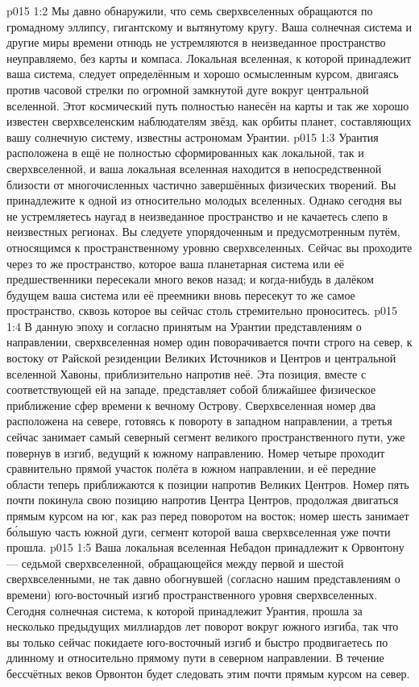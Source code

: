 \vs p015 1:2 Мы давно обнаружили, что семь сверхвселенных обращаются по громадному эллипсу, гигантскому и вытянутому кругу. Ваша солнечная система и другие миры времени отнюдь не устремляются в неизведанное пространство неуправляемо, без карты и компаса. Локальная вселенная, к которой принадлежит ваша система, следует определённым и хорошо осмысленным курсом, двигаясь против часовой стрелки по огромной замкнутой дуге вокруг центральной вселенной. Этот космический путь полностью нанесён на карты и так же хорошо известен сверхвселенским наблюдателям звёзд, как орбиты планет, составляющих вашу солнечную систему, известны астрономам Урантии.
\vs p015 1:3 Урантия расположена в ещё не полностью сформированных как локальной, так и сверхвселенной, и ваша локальная вселенная находится в непосредственной близости от многочисленных частично завершённых физических творений. Вы принадлежите к одной из относительно молодых вселенных. Однако сегодня вы не устремляетесь наугад в неизведанное пространство и не качаетесь слепо в неизвестных регионах. Вы следуете упорядоченным и предусмотренным путём, относящимся к пространственному уровню сверхвселенных. Сейчас вы проходите через то же пространство, которое ваша планетарная система или её предшественники пересекали много веков назад; и когда\hyp{}нибудь в далёком будущем ваша система или её преемники вновь пересекут то же самое пространство, сквозь которое вы сейчас столь стремительно проноситесь.
\vs p015 1:4 \pc В данную эпоху и согласно принятым на Урантии представлениям о направлении, сверхвселенная номер один поворачивается почти строго на север, к востоку от Райской резиденции Великих Источников и Центров и центральной вселенной Хавоны, приблизительно напротив неё. Эта позиция, вместе с соответствующей ей на западе, представляет собой ближайшее физическое приближение сфер времени к вечному Острову. Сверхвселенная номер два расположена на севере, готовясь к повороту в западном направлении, а третья сейчас занимает самый северный сегмент великого пространственного пути, уже повернув в изгиб, ведущий к южному направлению. Номер четыре проходит сравнительно прямой участок полёта в южном направлении, и её передние области теперь приближаются к позиции напротив Великих Центров. Номер пять почти покинула свою позицию напротив Центра Центров, продолжая двигаться прямым курсом на юг, как раз перед поворотом на восток; номер шесть занимает б\'ольшую часть южной дуги, сегмент которой ваша сверхвселенная уже почти прошла.
\vs p015 1:5 Ваша локальная вселенная Небадон принадлежит к Орвонтону --- седьмой сверхвселенной, обращающейся между первой и шестой сверхвселенными, не так давно обогнувшей (согласно нашим представлениям о времени) юго\hyp{}восточный изгиб пространственного уровня сверхвселенных. Сегодня солнечная система, к которой принадлежит Урантия, прошла за несколько предыдущих миллиардов лет поворот вокруг южного изгиба, так что вы только сейчас покидаете юго\hyp{}восточный изгиб и быстро продвигаетесь по длинному и относительно прямому пути в северном направлении. В течение бессчётных веков Орвонтон будет следовать этим почти прямым курсом на север.
